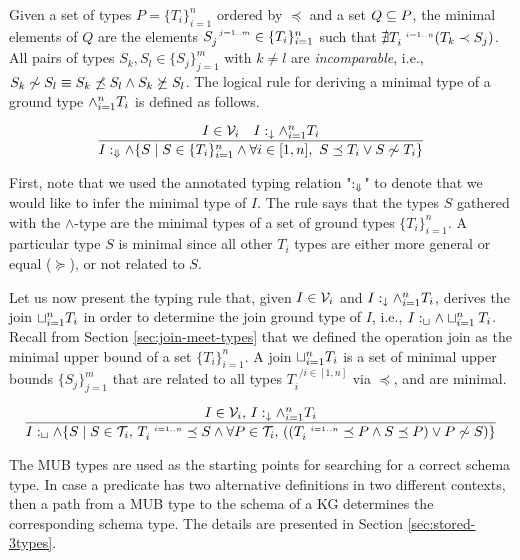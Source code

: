 \documentclass[runningheads]{llncs}
\newcommand{\s}{\scriptscriptstyle\ \,}
\newcommand{\darr}{\downarrow}
\newcommand{\Darr}{\Downarrow}
\newcommand{\V}{{\cal V}}
\newcommand{\T}{{\cal T}}
\begin{document}
Given a set of types $P=\{T_i\}_{i=1}^n$ ordered by $\preceq$ and a
set $Q\subseteq\/P$, the minimal elements of $Q$ are the elements
$S_j^{\s\/j=1..m}\in\{T_i\}_{i=1}^n$ such that
${\nexists}\/T_i^{\s\/i=1..n}(T_k\prec\/S_j)$. All pairs of types
$S_k,S_l\in\{S_j\}_{j=1}^m$ with $k\not=l$ are \emph{incomparable},
i.e.,
$S_k\not\sim\/S_l\equiv\/S_k\not\preceq\/S_l\land\/S_k\not\succeq\/S_l$.
The logical rule for deriving a minimal type of a ground type
$\land_{i=1}^n\/T_i$ is defined as follows.

\begin{equation}
\label{rul:min}
\dfrac{I\in\V_i\quad\/I:_\darr\land_{i=1}^n\/T_i}
      {I:_{\Darr}\land \{S \mid S\in\/\{T_i\}_{i=1}^n\land\forall\/i\in[1,n],\ S\preceq\/T_i\lor\/S\not\sim\/T_i\}}
\end{equation}

First, note that we used the annotated typing relation "$:_\Darr\/$"
to denote that we would like to infer the minimal type of $I$. The
rule says that the types $S$ gathered with the $\land$-type are the
minimal types of a set of ground types $\{T_i\}_{i=1}^n$. A particular
type $S$ is minimal since all other $T_i$ types are either more
general or equal ($\succeq$), or not related to $S$.
  
Let us now present the typing rule that, given $I\in\V_i$ and
$I:_\darr\land_{i=1}^n\/T_i$, derives the join $\sqcup_{i=1}^n\/T_i$
in order to determine the join ground type of $I$, i.e.,
$I:_\sqcup\land\sqcup_{i=1}^n\/T_i$. Recall from Section
\ref{sec:join-meet-types} that we defined the operation join as the
minimal upper bound of a set $\{T_i\}_{i=1}^n$. A join
$\sqcup_{i=1}^n\/T_i$ is a set of minimal upper bounds
$\{S_j\}_{j=1}^m$ that are related to all types $T_i^{\s/i\in[1,n]}$
via $\preceq$, and are minimal.

\begin{equation}
\label{rul:join-logic}
\dfrac{I\in\V_i,\, \/I:_\darr\land_{i=1}^n\/T_i}
      {I:_\sqcup\land\{S \mid \/S\in\T_i,\,\/T_i^{\s\/i=1..n}\preceq\/S\land\forall\/P\in\T_i,\,((T_i^{\s\/i=1..n}\preceq\/P\land\/S\preceq\/P)\lor\/P\not\sim\/S)\}}
\end{equation}

The MUB types are used as the starting points for searching for a
correct schema type. In case a predicate has two alternative
definitions in two different contexts, then a path from a MUB type to
the schema of a KG determines the corresponding schema type. The
details are presented in Section \ref{sec:stored-3types}.
\end{document}
